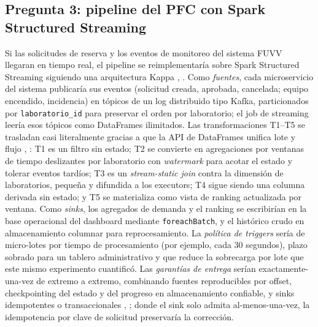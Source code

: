 \documentclass[10pt,journal]{IEEEtran}
\begin{document}
\subsection{Pregunta 3: pipeline del PFC con Spark Structured Streaming}
Si las solicitudes de reserva y los eventos de monitoreo del sistema FUVV
llegaran en tiempo real, el pipeline se reimplementar\'ia sobre Spark
Structured Streaming siguiendo una arquitectura Kappa \cite{armbrust2018},
\cite{armbrust2010}. Como \emph{fuentes}, cada microservicio del sistema
publicar\'ia sus eventos (solicitud creada, aprobada, cancelada; equipo
encendido, incidencia) en t\'opicos de un log distribuido tipo Kafka,
particionados por \texttt{laboratorio\_id} para preservar el orden por
laboratorio; el job de streaming leer\'ia esos t\'opicos como DataFrames
ilimitados. Las transformaciones T1--T5 se trasladan casi literalmente gracias
a que la API de DataFrames unifica lote y flujo \cite{armbrust2015},
\cite{zaharia2016}: T1 es un filtro sin estado; T2 se convierte en agregaciones
por ventanas de tiempo deslizantes por laboratorio con \emph{watermark} para
acotar el estado y tolerar eventos tard\'ios; T3 es un \emph{stream-static
join} contra la dimensi\'on de laboratorios, peque\~na y difundida a los
executors; T4 sigue siendo una columna derivada sin estado; y T5 se materializa
como vista de ranking actualizada por ventana. Como \emph{sinks}, los agregados
de demanda y el ranking se escribir\'ian en la base operacional del dashboard
mediante \texttt{foreachBatch}, y el hist\'orico crudo en almacenamiento
columnar para reprocesamiento. La \emph{pol\'itica de triggers} ser\'ia de
micro-lotes por tiempo de procesamiento (por ejemplo, cada 30 segundos), plazo
sobrado para un tablero administrativo y que reduce la sobrecarga por lote que
este mismo experimento cuantific\'o. Las \emph{garant\'ias de entrega} ser\'ian
exactamente-una-vez de extremo a extremo, combinando fuentes reproducibles por
offset, checkpointing del estado y del progreso en almacenamiento confiable, y
sinks idempotentes o transaccionales \cite{armbrust2018}, \cite{zaharia2016};
donde el sink solo admita al-menos-una-vez, la idempotencia por clave de
solicitud preservar\'ia la correcci\'on.
\end{document}

